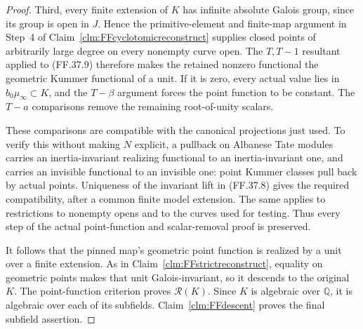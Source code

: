 \begin{proof}
Third, every finite extension of
\(K\) has infinite absolute Galois
group, since its group is open in
\(J\). Hence the primitive-element
and finite-map argument in Step~4
of Claim~\ref{clm:FFcyclotomicreconstruct}
supplies closed points of arbitrarily
large degree on every nonempty
curve open. The \(T,T-1\) resultant
applied to (FF.37.9) therefore makes
the retained nonzero functional the
geometric Kummer functional of a unit.
If it is zero, every actual value
lies in \(b_0\mu_\infty\subset K\),
and the \(T-\beta\) argument forces
the point function to be constant.
The \(T-a\) comparisons remove the
remaining root-of-unity scalars.

These comparisons are compatible
with the canonical projections just
used. To verify this without making
\(N\) explicit, a pullback on
Albanese Tate modules carries an
inertia-invariant realizing functional
to an inertia-invariant one, and
carries an invisible functional to
an invisible one: point Kummer
classes pull back by actual points.
Uniqueness of the invariant lift
in (FF.37.8) gives the required
compatibility, after a common finite
model extension. The same applies
to restrictions to nonempty opens
and to the curves used for testing.
Thus every step of the actual
point-function and scalar-removal
proof is preserved.

It follows that the pinned map's
geometric point function is realized
by a unit over a finite extension.
As in Claim~\ref{clm:FFstrictreconstruct},
equality on geometric points makes
that unit Galois-invariant, so it
descends to the original \(K\).
The point-function criterion
\citep[Theorem~4.18(5)]{FF_CHW2024}
proves \(\mathcal R(K)\).
Since \(K\) is algebraic over
\(\mathbb Q\), it is algebraic
over each of its subfields.
Claim~\ref{clm:FFdescent} proves
the final subfield assertion.
\end{proof}
